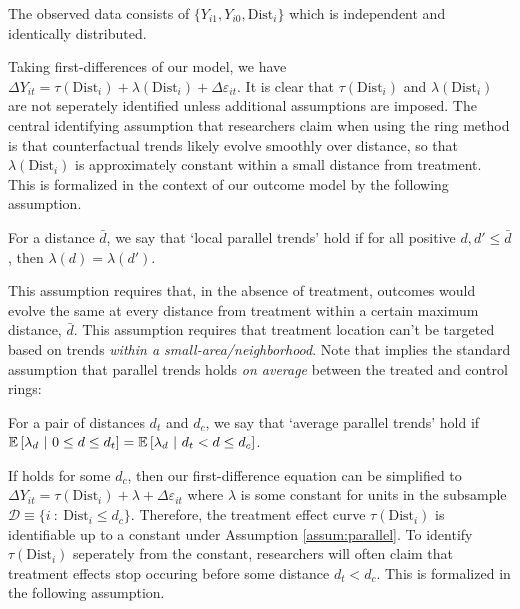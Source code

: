 \documentclass[10pt]{article}
\newcommand{\dist}{\text{Dist}}
\begin{document}
\begin{assumption}
    The observed data consists of $\{ Y_{i1}, Y_{i0}, \dist_{i}\}$ which is independent and identically distributed.
\end{assumption}

Taking first-differences of our model, we have $\Delta Y_{it} = \tau(\dist_i) + \lambda(\dist_i) + \Delta \varepsilon_{it}$. It is clear that $\tau(\dist_i)$ and $\lambda(\dist_i)$ are not seperately identified unless additional assumptions are imposed. The central identifying assumption that researchers claim when using the ring method is that counterfactual trends likely evolve smoothly over distance, so that $\lambda(\dist_i)$ is approximately constant within a small distance from treatment. This is formalized in the context of our outcome model by the following assumption. 

\begin{assumption}\label{assum:parallel}
    For a distance $\bar{d}$, we say that `local parallel trends' hold if for all positive $d, d' \leq \bar{d}$, then $\lambda(d) = \lambda(d')$.
\end{assumption}

This assumption requires that, in the absence of treatment, outcomes would evolve the same at every distance from treatment within a certain maximum distance, $\bar{d}$. This assumption requires that treatment location can't be targeted based on trends \emph{within a small-area/neighborhood}. Note that  implies the standard assumption that parallel trends holds \emph{on average} between the treated and control rings:

\begin{assumption}\label{assum:parallel_weak}
    For a pair of distances $d_t$ and $d_c$, we say that `average parallel trends' hold if $\mathbb{E}\left[\lambda_d \ \vert \ 0 \leq d \leq d_t\right] = \mathbb{E}\left[\lambda_d \ \vert \ d_t < d \leq d_c\right]$.
\end{assumption}

If  holds for some $d_c$, then our first-difference equation can be simplified to $\Delta Y_{it} = \tau(\dist_i) + \lambda + \Delta \varepsilon_{it}$ where $\lambda$ is some constant for units in the subsample $\mathcal{D} \equiv \{i \ : \ \dist_i \leq d_c \} $. Therefore, the treatment effect curve $\tau(\dist_i)$ is identifiable up to a constant under Assumption \ref{assum:parallel}. To identify $\tau(\dist_i)$ seperately from the constant, researchers will often claim that treatment effects stop occuring before some distance $d_t < d_c$. This is formalized in  the following assumption. 
\end{document}
